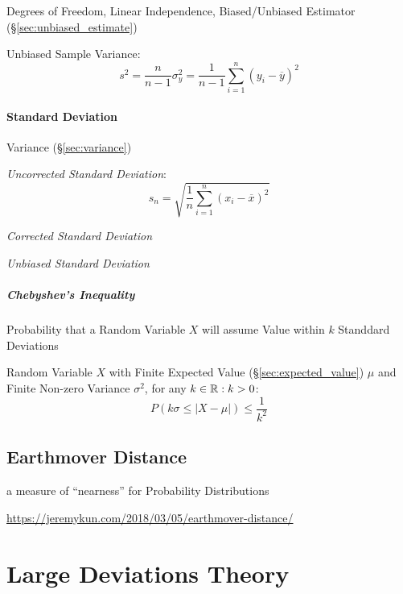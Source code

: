 Degrees of Freedom, Linear Independence, Biased/Unbiased Estimator
(\S\ref{sec:unbiased_estimate})

Unbiased Sample Variance:
\[
  s^2 = \frac{n}{n-1}\sigma^2_y =
  \frac{1}{n-1} \sum_{i=1}^n (y_i - \overline{y})^2
\]



\paragraph{Standard Deviation}\label{sec:standard_deviation}\hfill

Variance (\S\ref{sec:variance})

\emph{Uncorrected Standard Deviation}:
\[
  s_n = \sqrt{\frac{1}{n}\sum_{i=1}^n (x_i - \overline{x})^2}
\]

\emph{Corrected Standard Deviation}

\emph{Unbiased Standard Deviation}



\subparagraph{Chebyshev's Inequality}\label{sec:chebyshevs_inequality}
\hfill

Probability that a Random Variable $X$ will assume Value within $k$
Standdard Deviations

Random Variable $X$ with Finite Expected Value
(\S\ref{sec:expected_value}) $\mu$ and Finite Non-zero Variance
$\sigma^2$, for any $k \in \mathbb{R} : k > 0$:
\[
  P(k\sigma \leq |X - \mu|) \leq \frac{1}{k^2}
\]



\subsection{Earthmover Distance}\label{sec:earthmover_distance}


a measure of ``nearness'' for Probability Distributions

\url{https://jeremykun.com/2018/03/05/earthmover-distance/}



\section{Large Deviations Theory}\label{sec:large_deviations_theory}

